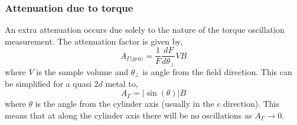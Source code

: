 % 

\subsubsection{Attenuation due to torque}

An extra attenuation occurs due solely to the nature of the torque oscillation measurement. The attenuation factor is given by,
\begin{equation}
    A_{\Gamma \textrm{(gen)}} = \frac{1}{F}\frac{dF}{d\theta_\perp}VB
\end{equation}
where $V$ is the sample volume and $\theta_\perp$ is angle from the field direction. This can be simplified for a quasi $2d$ metal to,
\begin{equation}
    A_{\Gamma} = |\sin(\theta)|B
\end{equation}
where $\theta$ is the angle from the cylinder axis (usually in the $c$ direction). This means that at along the cylinder axis there will be no oscillations as $A_{\Gamma} \to 0$.


